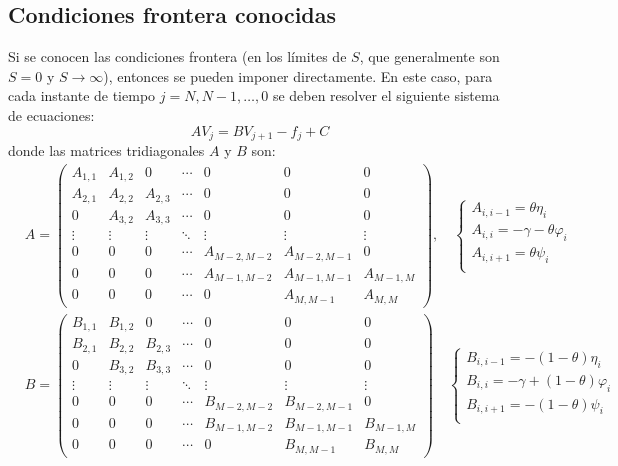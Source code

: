 \subsection{Condiciones frontera conocidas}
Si se conocen las condiciones frontera (en los límites de $S$, que generalmente son $S=0$ y $S\to\infty$), entonces se pueden imponer directamente. En este caso, para cada instante de tiempo $j=N, N-1, \ldots, 0$ se deben resolver el siguiente sistema de ecuaciones:
\begin{equation*}
    \boxed{A V_j = B V_{j+1} - f_j + C}
\end{equation*}
donde las matrices tridiagonales $A$ y $B$ son:
\begin{align*}
    &\boxed{
        A = \begin{pmatrix}
            A_{1,1} & A_{1,2} & 0 & \cdots & 0 & 0 & 0 \\
            A_{2,1} & A_{2,2} & A_{2,3} & \cdots & 0 & 0 & 0 \\
            0 & A_{3,2} & A_{3,3} & \cdots & 0 & 0 & 0 \\
            \vdots & \vdots & \vdots & \ddots & \vdots & \vdots & \vdots \\
            0 & 0 & 0 & \cdots & A_{M-2,M-2} & A_{M-2,M-1} & 0 \\
            0 & 0 & 0 & \cdots & A_{M-1,M-2} & A_{M-1,M-1} & A_{M-1,M} \\
            0 & 0 & 0 & \cdots & 0  & A_{M,M-1} & A_{M,M}
        \end{pmatrix},
        \quad \begin{cases}
            A_{i,i-1} = \theta\eta_i \\
            A_{i,i} = -\gamma - \theta \varphi_i \\
            A_{i,i+1} = \theta\psi_i \\
        \end{cases}
    } \\
    & \boxed{
        B = \begin{pmatrix}
            B_{1,1} & B_{1,2} & 0 & \cdots & 0 & 0 & 0 \\
            B_{2,1} & B_{2,2} & B_{2,3} & \cdots & 0 & 0 & 0 \\
            0 & B_{3,2} & B_{3,3} & \cdots & 0 & 0 & 0 \\
            \vdots & \vdots & \vdots & \ddots & \vdots & \vdots & \vdots \\
            0 & 0 & 0 & \cdots & B_{M-2,M-2} & B_{M-2,M-1} & 0 \\
            0 & 0 & 0 & \cdots & B_{M-1,M-2} & B_{M-1,M-1} & B_{M-1,M} \\
            0 & 0 & 0 & \cdots & 0  & B_{M,M-1} & B_{M,M}
        \end{pmatrix}
        \quad \begin{cases}
            B_{i,i-1} = -(1-\theta)\eta_i \\
            B_{i,i} = -\gamma + (1-\theta) \varphi_i \\
            B_{i,i+1} = -(1-\theta)\psi_i \\
        \end{cases}
    }
\end{align*}
